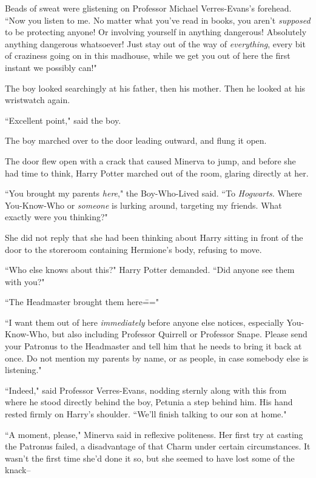 Beads of sweat were glistening on Professor Michael Verres-Evans's forehead. ``Now you listen to me. No matter what you've read in books, you aren't \emph{supposed} to be protecting anyone! Or involving yourself in anything dangerous! Absolutely anything dangerous whatsoever! Just stay out of the way of \emph{everything}, every bit of craziness going on in this madhouse, while we get you out of here the first instant we possibly can!"

The boy looked searchingly at his father, then his mother. Then he looked at his wristwatch again.

``Excellent point," said the boy.

The boy marched over to the door leading outward, and flung it open.

\later

The door flew open with a crack that caused Minerva to jump, and before she had time to think, Harry Potter marched out of the room, glaring directly at her.

``You brought my parents \emph{here}," the Boy-Who-Lived said. ``To \emph{Hogwarts.} Where You-Know-Who or \emph{someone} is lurking around, targeting my friends. What exactly were you thinking?"

She did not reply that she had been thinking about Harry sitting in front of the door to the storeroom containing Hermione's body, refusing to move.

``Who else knows about this?" Harry Potter demanded. ``Did anyone see them with you?"

``The Headmaster brought them here\==="

``I want them out of here \emph{immediately} before anyone else notices, especially You-Know-Who, but also including Professor Quirrell or Professor Snape. Please send your Patronus to the Headmaster and tell him that he needs to bring it back at once. Do not mention my parents by name, or as people, in case somebody else is listening."

``Indeed," said Professor Verres-Evans, nodding sternly along with this from where he stood directly behind the boy, Petunia a step behind him. His hand rested firmly on Harry's shoulder. ``We'll finish talking to our son at home."

``A moment, please," Minerva said in reflexive politeness. Her first try at casting the Patronus failed, a disadvantage of that Charm under certain circumstances. It wasn't the first time she'd done it so, but she seemed to have lost some of the knack\---

